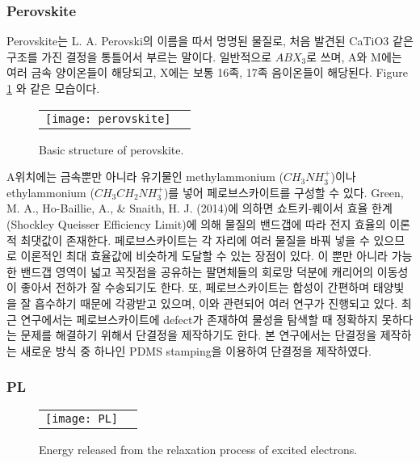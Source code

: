 \subsubsection{Perovskite}
Perovskite는 L. A. Perovski의 이름을 따서 명명된 물질로, 처음 발견된 CaTiO3  같은 구조를 가진 결정을 통틀어서 부르는 말이다. 일반적으로 $ABX_3$로 쓰며, A와 M에는 여러 금속 양이온들이 해당되고, X에는 보통 16족, 17족 음이온들이 해당된다. Figure \ref{fig:perov} 와 같은 모습이다.
\begin{figure}[H]
	\begin{center}
		\begin{tabular}{cc}
			\texttt{[image: perovskite]}
		\end{tabular}
	\end{center}
	\caption{Basic structure of perovskite.}
	\label{fig:perov} 
\end{figure}
A위치에는 금속뿐만 아니라 유기물인  methylammonium ($CH_3NH_3^+$)이나 ethylammonium ($CH_3CH_2NH_3^+$)를 넣어 페로브스카이트를 구성할 수 있다. Green, M. A., Ho-Baillie, A., & Snaith, H. J. (2014)에 의하면 쇼트키-퀘이서 효율 한계(Shockley Queisser Efficiency Limit)에 의해 물질의 밴드갭에 따라 전지 효율의 이론적 최댓값이 존재한다\cite{green2014emergence}. 페로브스카이트는 각 자리에 여러 물질을 바꿔 넣을 수 있으므로 이론적인 최대 효율값에 비슷하게 도달할 수  있는 장점이 있다. 이 뿐만 아니라 가능한 밴드갭 영역이 넓고 꼭짓점을 공유하는 팔면체들의 회로망 덕분에 캐리어의 이동성이 좋아서 전하가 잘 수송되기도 한다\cite{green2014emergence}.
또, 페로브스카이트는 합성이 간편하며 태양빛을 잘 흡수하기 때문에 각광받고 있으며, 이와 관련되어 여러 연구가 진행되고 있다. 최근 연구에서는 페로브스카이트에 defect가 존재하여 물성을 탐색할 때 정확하지 못하다는 문제를 해결하기 위해서 단결정을 제작하기도 한다. 본 연구에서는 단결정을 제작하는 새로운 방식 중 하나인 PDMS stamping을 이용하여 단결정을 제작하였다.


\subsubsection{PL}

\begin{figure}[H]
	\begin{center}
		\begin{tabular}{cc}
			\texttt{[image: PL]}
		\end{tabular}
	\end{center}
	\caption{Energy released from the relaxation process of excited electrons.}
	\label{fig:pl} 
\end{figure}

